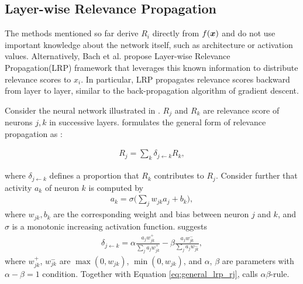 \subsection{Layer-wise Relevance Propagation}
The methods mentioned so far derive $R_i$ directly from $f(\patvector{x})$ and do not  use important knowledge about the network itself, such as architecture or activation values. Alternatively, Bach et	 al.\cite{BinderLayerwiseRelevancePropagation2016} propose Layer-wise Relevance Propagation(LRP) framework that leverages this known information to distribute relevance scores to $x_i$. In particular, LRP propagates relevance scores backward from layer to layer, similar to the back-propagation algorithm of gradient descent.


Consider the neural network illustrated in \addfigure{\ref{fig:lrp_graph}}. $R_j$ and $R_k$ are relevance score of  neurons $j,k$ in successive layers.  \cite{BinderLayerwiseRelevancePropagation2016} formulates the general form of relevance propagation as :

\begin{align} \label{eq:general_lrp_rj}
	R_j = \sum_{k} 	\delta_{j\leftarrow k} R_{k} ,
\end{align}

where $\delta_{j\leftarrow k}$ defines a proportion that  $R_{k}$ contributes to $R_j$. Consider further that activity $a_k$ of neuron $k$ is computed by 
\begin{align*}
	a_k = \sigma \bigg( \sum_{j} w_{jk} a_j + b_k \bigg),
\end{align*} 
where $w_{jk}, b_k$ are the corresponding weight and bias between neuron $j$ and $k$, and $\sigma$ is a monotonic increasing activation function. \cite{BinderLayerwiseRelevancePropagation2016} suggests 
\begin{align}
	\delta_{j\leftarrow k} = \alpha\frac{a_j w_{jk}^+}{\sum_{j} a_jw_{jk}^+} - \beta\frac{a_j w_{jk}^-}{\sum_{j} a_jw_{jk}^-},
\end{align}
where $w_{jk}^+$, $w_{jk}^-$ are $\max(0, w_{jk})$, $\min(0, w_{jk})$, and $\alpha$,  $\beta$ are parameters with $\alpha-\beta = 1$ condition. Together with Equation \ref{eq:general_lrp_rj}, \cite{BinderLayerwiseRelevancePropagation2016} calls $\alpha\beta$-rule.

